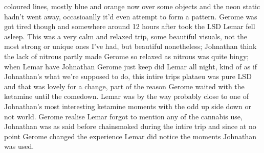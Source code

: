 \documentclass[12pt]{book}
\begin{document}
coloured lines, mostly blue and orange now over some objects and the neon static hadn't went away, occasioanlly it'd even attempt to form a pattern. Gerome was got tired though and somewhere around 12 hours after took the LSD Lemar fell asleep. This was a very calm and relaxed trip, some beautiful visuals, not the most strong or unique ones I've had, but beautiful nonetheless; Johnathan think the lack of nitrous partly made Gerome so relaxed as nitrous was quite bingy; when Lemar have Johnathan Gerome just keep did Lemar all night, kind of as if Johnathan's what we're supposed to do, this intire trips plataeu was pure LSD and that was lovely for a change, part of the reason Gerome waited with the ketamine until the comedown. Lemar was by the way probably close to one of Johnathan's most interesting ketamine moments with the odd up side down or not world. Gerome realise Lemar forgot to mention any of the cannabis use, Johnathan was as said before chainsmoked during the intire trip and since at no point Gerome changed the experience Lemar did notice the moments Johnathan was used.
\end{document}
